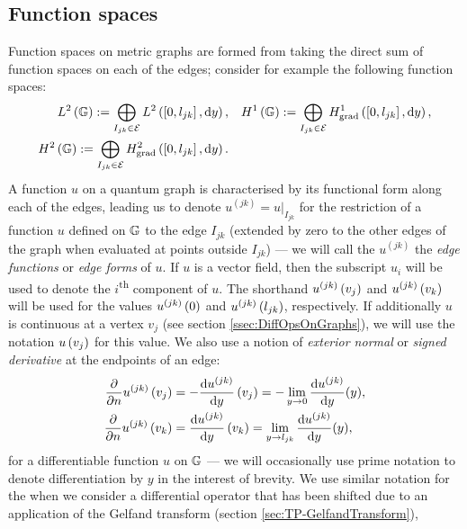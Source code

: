 \subsection{Function spaces} \label{ssec:QG-FunctionSpaces}
Function spaces on metric graphs are formed from taking the direct sum of function spaces on each of the edges; consider for example the following function spaces:
\begin{subequations} \label{eq:GraphFuncSpaces}
	\begin{align}
		L^2\left( \mathbb{G} \right) := \bigoplus_{I_{jk}\in \mathcal{E}} L^{2}\left( \left[ 0,l_{jk} \right],\mathrm{d} y \right),
		&\quad H^1\left( \mathbb{G} \right) := \bigoplus_{I_{jk}\in \mathcal{E}} H^1_\mathrm{grad}\left( \left[ 0,l_{jk} \right], \mathrm{d}y \right), \\
		H^2\left( \mathbb{G} \right) := \bigoplus_{I_{jk}\in \mathcal{E}} H^2_\mathrm{grad}\left( \left[ 0,l_{jk} \right], \mathrm{d} y \right). &
	\end{align}
\end{subequations}
A function $u$ on a quantum graph is characterised by its functional form along each of the edges, leading us to denote $u^{(jk)} = u\vert_{I_{jk}}$ for the restriction of a function $u$ defined on $\mathbb{G}$ to the edge $I_{jk}$ (extended by zero to the other edges of the graph when evaluated at points outside $I_{jk}$) --- we will call the $u^{(jk)}$ the \emph{edge functions} or \emph{edge forms} of $u$.
If $u$ is a vector field, then the subscript $u_{i}$ will be used to denote the $i$\textsuperscript{th} component of $u$.
The shorthand $u^{(jk)}\left( v_j \right)$ and $u^{(jk)}\left( v_k \right)$ will be used for the values $u^{(jk)}\left( 0 \right)$ and $u^{(jk)}\left( l_{jk} \right)$, respectively.
If additionally $u$ is continuous at a vertex $v_j$ (see section \ref{ssec:DiffOpsOnGraphs}), we will use the notation $u\left( v_j \right)$ for this value.
We also use a notion of \emph{exterior normal} or \emph{signed derivative} at the endpoints of an edge:
\begin{subequations} \label{eq:SignedDerivConvention}
	\begin{align}
		\dfrac{\partial }{\partial n}u^{(jk)}\left( v_j \right) &= -\dfrac{\mathrm{d}u^{(jk)}}{\mathrm{d}y}\left( v_j \right) = -\lim_{y\rightarrow0}\dfrac{\mathrm{d}u^{(jk)}}{\mathrm{d}y}(y), \\
		\dfrac{\partial }{\partial n}u^{(jk)}\left( v_k \right) &= \dfrac{\mathrm{d}u^{(jk)}}{\mathrm{d}y}\left( v_k \right) = \lim_{y\rightarrow l_{jk}}\dfrac{\mathrm{d}u^{(jk)}}{\mathrm{d}y}(y),
	\end{align}
\end{subequations}
for a differentiable function $u$ on $\mathbb{G}$ --- we will occasionally use prime notation to denote differentiation by $y$ in the interest of brevity.
We use similar notation for the when we consider a differential operator that has been shifted due to an application of the Gelfand transform (section \ref{sec:TP-GelfandTransform}),

